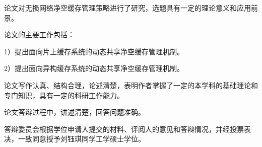 论文对无损网络净空缓存管理策略进行了研究，选题具有一定的理论意义和应用前景。

论文的主要工作包括：

1）提出面向片上缓存系统的动态共享净空缓存管理机制。

2）提出面向异构缓存系统的动态共享净空缓存管理机制。

论文写作认真、结构合理，论述清楚，表明作者掌握了一定的本学科的基础理论和专门知识，具有一定的科研工作能力。

论文答辩过程中，讲述清楚，回答问题准确。

答辩委员会根据学位申请人提交的材料、评阅人的意见和答辩情况，并经投票表决，一致同意授予刘钰琪同学工学硕士学位。
